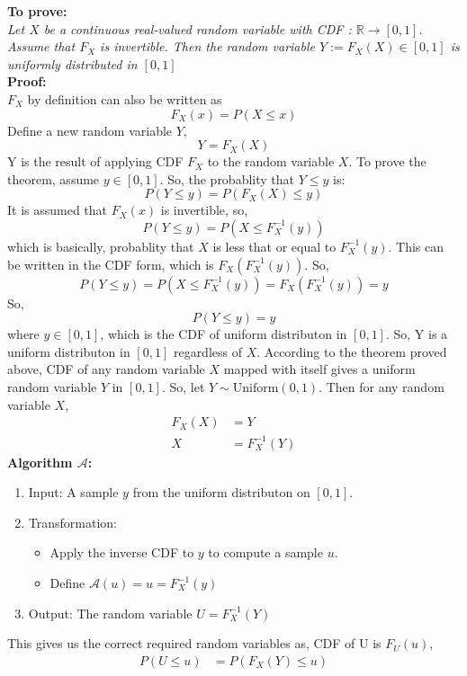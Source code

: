 \begin{solution}
	\textbf{To prove: }\\
	\emph{Let $X$ be a continuous real-valued random variable with CDF  : $\mathbb{R} \rightarrow [0, 1]$. Assume that
		$F_X$ is invertible. Then the random variable $Y := F_X (X) \in [0, 1]$ is uniformly distributed in $[0, 1]$}\\
	\textbf{Proof:}\\
	$F_X$ by definition can also be written as
	\[F_X(x) = P(X\leq x)\]
	Define a new random variable $Y$,
	\[Y =F_X(X) \]
	Y is the result of applying CDF $F_X$ to the random variable $X$.
	To prove the theorem, assume $y\in [0,1]$. So, the probablity that $Y \leq y$ is:
	\[P(Y\leq y) = P(F_X(X)\leq y)\]
	It is assumed that $F_X(x)$ is invertible, so,
	\[P(Y\leq y) = P(X\leq F_X^{-1}(y))\]
	which is basically, probablity that $X$ is less that or equal to $F_X^{-1}(y)$. This can be written in the CDF form, which is $F_X(F_X^{-1}(y))$. So,
	\[P(Y\leq y) = P(X\leq F_X^{-1}(y)) = F_X(F_X^{-1}(y)) = y\]
	So,
	\[P(Y\leq y) = y\]
	where $y\in [0,1]$, which is the CDF of uniform distributon in $[0,1]$.
	So, Y is a uniform distributon in $[0,1]$ regardless of $X$.
	According to the theorem proved above, CDF of any random variable $X$ mapped with itself gives a uniform
	random variable $Y$ in $[0,1]$. So, let $Y\sim \text{Uniform}(0,1)$. Then for any random variable $X$,
	\begin{align}
		F_X(X) & = Y           \\
		X      & = F_X^{-1}(Y)
	\end{align}
	\textbf{Algorithm $\mathcal{A}$:}
	\begin{enumerate}
		\item Input: A sample $y$ from the uniform distributon on $[0,1]$.
		\item Transformation:
		      \begin{itemize}
			      \item Apply the inverse CDF to $y$ to compute a sample $u$.
			      \item Define $\mathcal{A}(u) = u = F_X^{-1}(y)$
		      \end{itemize}
		\item Output: The random variable $U = F_X^{-1}(Y)$
	\end{enumerate}
	This gives us the correct required random variables as, CDF of U is $F_U(u)$,
	\begin{align}
		P(U\leq u ) & = P(F_X(Y) \leq u)            \\

\end{align}
\end{solution}
